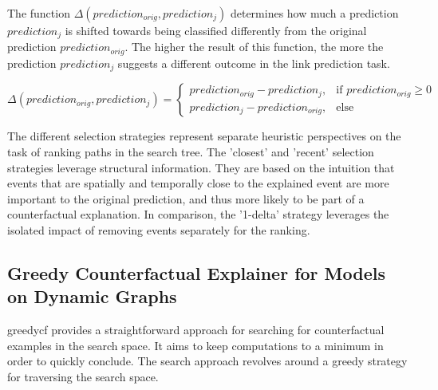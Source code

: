 The function $\Delta(prediction_{orig}, prediction_j)$ determines how much a prediction $prediction_j$ is shifted towards being classified differently from the original prediction $prediction_{orig}$. The higher the result of this function, the more the prediction $prediction_j$ suggests a different outcome in the link prediction task.

\begin{equation}
    \Delta(prediction_{orig}, prediction_j) = 
    \begin{cases}
        prediction_{orig} - prediction_j,  &\text{if } prediction_{orig} \geq 0 \\
        prediction_j - prediction_{orig},  &\text{else}
    \end{cases}
\end{equation}


The different selection strategies represent separate heuristic perspectives on the task of ranking paths in the search tree. The 'closest' and 'recent' selection strategies leverage structural information. They are based on the intuition that events that are spatially and temporally close to the explained event are more important to the original prediction, and thus more likely to be part of a counterfactual explanation. In comparison, the '1-delta' strategy leverages the isolated impact of removing events separately for the ranking.  


\subsection{Greedy Counterfactual Explainer for Models on Dynamic Graphs}
\label{s_Methodology_GreedyCF}

\acrfull{greedycf} provides a straightforward approach for searching for counterfactual examples in the search space. It aims to keep computations to a minimum in order to quickly conclude. The search approach revolves around a greedy strategy for traversing the search space.

